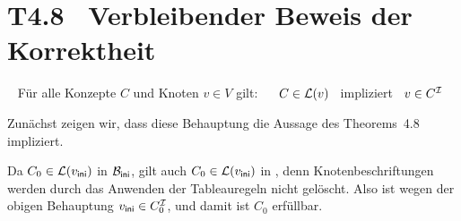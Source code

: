 \documentclass[fontsize=11pt, twoside=false, numbers=autoenddot]{scrbook}
\begin{document}
\section*{T4.8~ Verbleibender Beweis der Korrektheit}

~
Für alle Konzepte $C$ und Knoten $v \in V$ gilt:
~~
$C \in \mathcal{L}(v)$
~impliziert~
$v \in C^\mathcal{I}$

\par\medskip
Zunächst zeigen wir, dass diese Behauptung die Aussage
des Theorems~4.8 impliziert.

Da $C_0 \in \mathcal{L}(v_{\textsf{ini}})$ in $\mathcal{B}_{\textsf{ini}}$,
gilt auch $C_0 \in \mathcal{L}(v_{\textsf{ini}})$ in \Bmc,
denn Knotenbeschriftungen werden durch das Anwenden der Tableauregeln
nicht gelöscht.
Also ist wegen der obigen Behauptung $v_{\textsf{ini}} \in C_0^\mathcal{I}$,
und damit ist $C_0$ erfüllbar.
\end{document}
